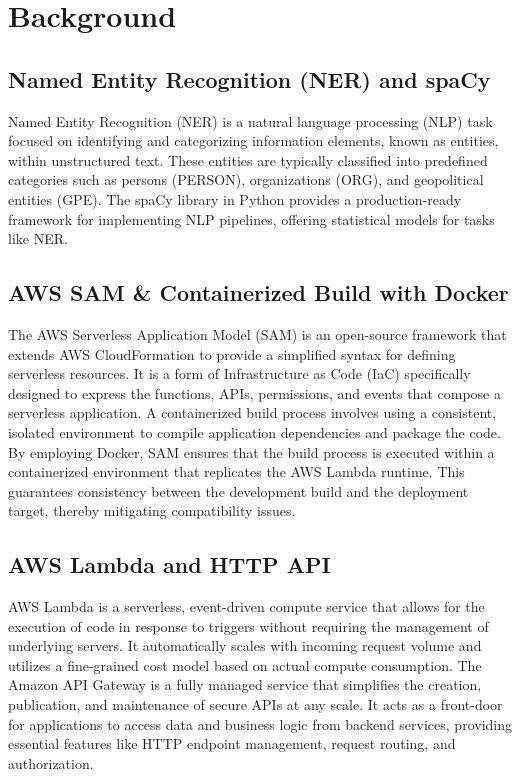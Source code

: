 \documentclass[11pt,a4paper]{article}
\begin{document}
\section{Background}

\subsection{Named Entity Recognition (NER) and spaCy}
Named Entity Recognition (NER) is a natural language processing (NLP) task focused on identifying and categorizing information elements, known as entities, within unstructured text. These entities are typically classified into predefined categories such as persons (\textsf{PERSON}), organizations (\textsf{ORG}), and geopolitical entities (\textsf{GPE}). The spaCy library in Python provides a production-ready framework for implementing NLP pipelines, offering statistical models for tasks like NER.

\subsection{AWS SAM \& Containerized Build with Docker}
The AWS Serverless Application Model (SAM) is an open-source framework that extends AWS CloudFormation to provide a simplified syntax for defining serverless resources. It is a form of Infrastructure as Code (IaC) specifically designed to express the functions, APIs, permissions, and events that compose a serverless application. A containerized build process involves using a consistent, isolated environment to compile application dependencies and package the code. By employing Docker, SAM ensures that the build process is executed within a containerized environment that replicates the AWS Lambda runtime. This guarantees consistency between the development build and the deployment target, thereby mitigating compatibility issues.

\subsection{AWS Lambda and HTTP API}
AWS Lambda is a serverless, event-driven compute service that allows for the execution of code in response to triggers without requiring the management of underlying servers. It automatically scales with incoming request volume and utilizes a fine-grained cost model based on actual compute consumption. The Amazon API Gateway is a fully managed service that simplifies the creation, publication, and maintenance of secure APIs at any scale. It acts as a front-door for applications to access data and business logic from backend services, providing essential features like HTTP endpoint management, request routing, and authorization.
\end{document}
